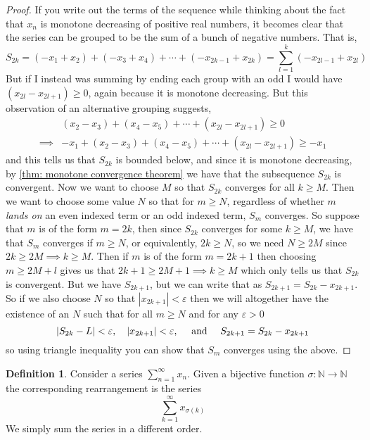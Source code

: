 \documentclass{article}
\theoremstyle{definition}
\newtheorem{definition}{Definition}[section]
\theoremstyle{remark}
\begin{document}
\begin{proof}
If you write out the terms of the sequence while thinking about the fact 
that $x_n$ is monotone decreasing of positive real numbers, it becomes clear 
that the series can be grouped to be the sum of a bunch of negative
numbers. That is, \[
S_{2k} = (-x_1 + x_2) + (-x_3 + x_4) + \cdots + (-x_{2k-1} + x_{2k}) = \sum_{l=1}^{k}{(-x_{2l-1}+x_{2l})}
\]
But if I instead was summing by ending each group with an odd I would have 
$(x_{2l} - x_{2l+1}) \geq 0$, again because it is monotone decreasing. But
this observation of an alternative grouping suggests, 
\begin{align*}
& (x_2-x_3) + (x_4 - x_5) + \cdots + (x_{2l} - x_{2l+1}) \geq 0 \\
\implies & -x_1 + (x_2-x_3) + (x_4 - x_5) + \cdots + (x_{2l} - x_{2l+1}) \geq -x_1
\end{align*}
and this tells us that $S_{2k}$ is bounded below, and since it is monotone decreasing, 
by \ref{thm: monotone convergence theorem} we have that the subsequence $S_{2k}$ is 
convergent. Now we want to choose $M$ so that $S_{2k}$ converges for all $k \geq M$. 
Then we want to choose some value $N$ so that for $m \geq N$, regardless
of whether $m$ \textit{lands on} an even indexed term or an odd indexed 
term, $S_m$ converges. So suppose that $m$ is of the form $m = 2k$, 
then since $S_{2k}$ converges for some $k \geq M$, we have that $S_m$ converges
if $m\geq N$, or equivalently, $2k \geq N$, so we need $N \geq 2M$ since $2k \geq 2M \implies k \geq M$.
Then if $m$ is of the form $m = 2k+1$ then choosing $m \geq 2M + l$ gives us
that $2k+1 \geq 2M+1 \implies k \geq M$ which only tells us that $S_{2k}$ is convergent. But we have $S_{2k+1}$, 
but we can write that as $S_{2k+1} = S_{2k} - x_{2k+1}$. So if we also choose $N$ so that 
$|x_{2k+1}| < \varepsilon$ then we will altogether have the existence of an $N$ such that 
for all $m \geq N$ and for any $\varepsilon > 0$
\[
|S_{2k} - L| < \varepsilon , \quad |x_{2k+1}| < \varepsilon , \quad
\textnormal{ and } \quad  S_{2k+1} = S_{2k} - x_{2k+1}
\]
so using triangle inequality you can show that $S_m$ converges using the above. 


\end{proof}









\begin{definition}
Consider a series $\sum^\infty_{n=1}{x_n}$. Given a bijective
function $\sigma: \mathbb{N} \to \mathbb{N}$ the corresponding rearrangement
is the series \[
\sum^\infty_{k=1}{x_{\sigma(k)}}
\]
We simply sum the series in a different order.
\end{definition}
\end{document}
